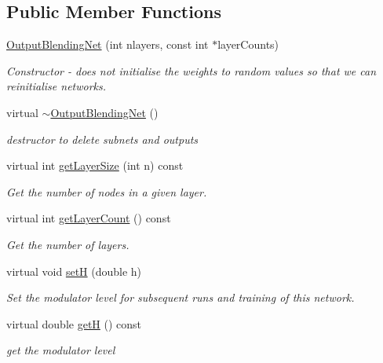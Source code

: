 \subsection*{Public Member Functions}
\begin{DoxyCompactItemize}
\item 
\hyperlink{classOutputBlendingNet_a7545b24e3d07493149dc8e6afd6cfd76}{Output\+Blending\+Net} (int nlayers, const int $\ast$layer\+Counts)
\begin{DoxyCompactList}\small\item\em Constructor -\/ does not initialise the weights to random values so that we can reinitialise networks. \end{DoxyCompactList}\item 
virtual \hyperlink{classOutputBlendingNet_a8889b5495af0ee4d1d7f30fd16263dc8}{$\sim$\+Output\+Blending\+Net} ()
\begin{DoxyCompactList}\small\item\em destructor to delete subnets and outputs \end{DoxyCompactList}\item 
virtual int \hyperlink{classOutputBlendingNet_ad31f525182b2949d406a203189b65ae8}{get\+Layer\+Size} (int n) const 
\begin{DoxyCompactList}\small\item\em Get the number of nodes in a given layer. \end{DoxyCompactList}\item 
virtual int \hyperlink{classOutputBlendingNet_ade2a917996b0325fd4b23d1584645d1a}{get\+Layer\+Count} () const 
\begin{DoxyCompactList}\small\item\em Get the number of layers. \end{DoxyCompactList}\item 
virtual void \hyperlink{classOutputBlendingNet_a089d2182d13a9f4dea2093843754dce7}{setH} (double h)
\begin{DoxyCompactList}\small\item\em Set the modulator level for subsequent runs and training of this network. \end{DoxyCompactList}\item 
virtual double \hyperlink{classOutputBlendingNet_a1d8ff29c1f29c431df31f9e22c89d529}{getH} () const 
\begin{DoxyCompactList}\small\item\em get the modulator level \end{DoxyCompactList}\item 

\end{DoxyCompactItemize}
